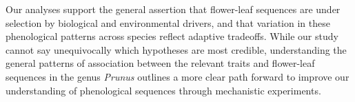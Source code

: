 \documentclass{article}[11pt]
\begin{document}
Our analyses support the general assertion that flower-leaf sequences are under selection by biological and environmental drivers, and that variation in these phenological patterns across species reflect adaptive tradeoffs. While our study cannot say unequivocally which hypotheses are most credible, understanding the general patterns of association between the relevant traits and flower-leaf sequences in the genus \textit{Prunus} outlines a more clear path forward to improve our understanding of phenological sequences through mechanistic experiments.






\end{document}

